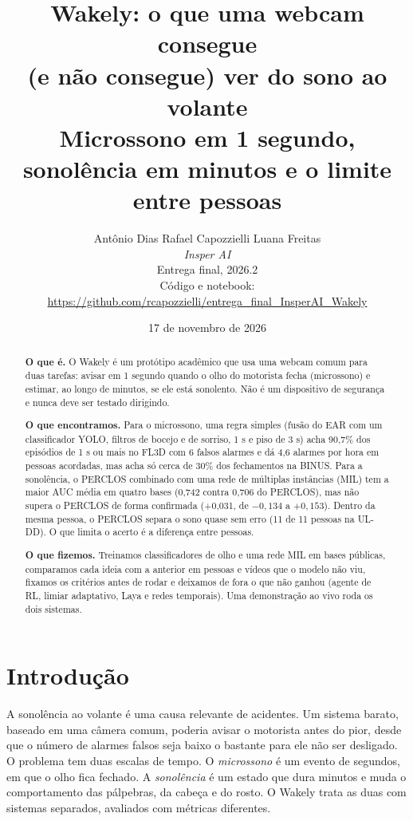 \documentclass[11pt,a4paper]{article}
\title{\vspace{-0.6cm}\textbf{Wakely: o que uma webcam consegue\\(e não consegue) ver do sono ao volante}\\[6pt]{\large\normalfont Microssono em 1 segundo, sonolência em minutos e o limite entre pessoas}}
\author{Antônio Dias \quad Rafael Capozzielli \quad Luana Freitas\\[2pt]
\textit{Insper AI}\\[2pt]
{\small Entrega final, 2026.2}\\[1pt]{\footnotesize Código e notebook: \url{https://github.com/rcapozzielli/entrega_final_InsperAI_Wakely}}}
\date{17 de novembro de 2026}
\begin{document}
\maketitle

\begin{abstract}
\noindent\textbf{O que é.} O Wakely é um protótipo acadêmico que usa uma webcam comum para duas tarefas: avisar em 1 segundo quando o olho do motorista fecha (microssono) e estimar, ao longo de minutos, se ele está sonolento. Não é um dispositivo de segurança e nunca deve ser testado dirigindo.

\smallskip\noindent\textbf{O que encontramos.} Para o microssono, uma regra simples (fusão do EAR com um classificador YOLO, filtros de bocejo e de sorriso, 1 s e piso de 3 s) acha 90,7\% dos episódios de 1 s ou mais no FL3D com 6 falsos alarmes e dá 4,6 alarmes por hora em pessoas acordadas, mas acha só cerca de 30\% dos fechamentos na BINUS. Para a sonolência, o PERCLOS combinado com uma rede de múltiplas instâncias (MIL) tem a maior AUC média em quatro bases (0,742 contra 0,706 do PERCLOS), mas não supera o PERCLOS de forma confirmada (+0,031, de $-0{,}134$ a $+0{,}153$). Dentro da mesma pessoa, o PERCLOS separa o sono quase sem erro (11 de 11 pessoas na UL-DD). O que limita o acerto é a diferença entre pessoas.

\smallskip\noindent\textbf{O que fizemos.} Treinamos classificadores de olho e uma rede MIL em bases públicas, comparamos cada ideia com a anterior em pessoas e vídeos que o modelo não viu, fixamos os critérios antes de rodar e deixamos de fora o que não ganhou (agente de RL, limiar adaptativo, Laya e redes temporais). Uma demonstração ao vivo roda os dois sistemas.
\end{abstract}

\section{Introdução}
\label{sec:intro}

A sonolência ao volante é uma causa relevante de acidentes. Um sistema barato, baseado em uma câmera comum, poderia avisar o motorista antes do pior, desde que o número de alarmes falsos seja baixo o bastante para ele não ser desligado. O problema tem duas escalas de tempo. O \emph{microssono} é um evento de segundos, em que o olho fica fechado. A \emph{sonolência} é um estado que dura minutos e muda o comportamento das pálpebras, da cabeça e do rosto. O Wakely trata as duas com sistemas separados, avaliados com métricas diferentes.
\end{document}
